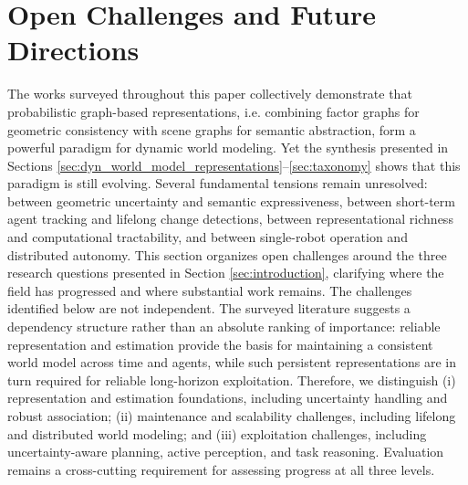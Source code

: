 \section{Open Challenges and Future Directions}\label{sec:challenges_future_works}

The works surveyed throughout this paper collectively demonstrate that probabilistic graph-based representations, i.e. combining factor graphs for geometric consistency with scene graphs for semantic abstraction, form a powerful paradigm for dynamic world modeling.
Yet the synthesis presented in Sections \ref{sec:dyn_world_model_representations}–\ref{sec:taxonomy} shows that this paradigm is still evolving. 
Several fundamental tensions remain unresolved: between geometric uncertainty and semantic expressiveness, between short-term agent tracking and lifelong change detections, between representational richness and computational tractability, and between single-robot operation and distributed autonomy.
This section organizes open challenges around the three research questions presented in Section \ref{sec:introduction}, clarifying where the field has progressed and where substantial work remains.
The challenges identified below are not independent.
The surveyed literature suggests a dependency structure rather than an absolute ranking of importance: reliable representation and estimation provide the basis for maintaining a consistent world model across time and agents, while such persistent representations are in turn required for reliable long-horizon exploitation.
Therefore, we distinguish (i) representation and estimation foundations, including uncertainty handling and robust association; (ii) maintenance and scalability challenges, including lifelong and distributed world modeling; and (iii) exploitation challenges, including uncertainty-aware planning, active perception, and task reasoning. 
Evaluation remains a cross-cutting requirement for assessing progress at all three levels.


